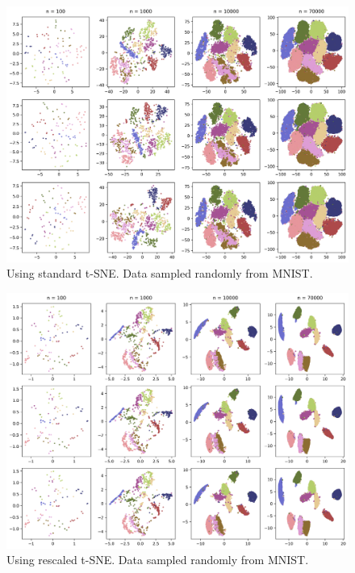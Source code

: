 \begin{figure}[h]
    \centering 
        \includegraphics[width=0.9\linewidth]{figures/rescaled/MNIST_standard_embedding_grid.png}
        \caption{Using standard t-SNE. Data sampled randomly from MNIST.}
    \label{fig:MNIST-standard}
\end{figure}

\begin{figure}[h]
    \centering 
        \includegraphics[width=0.9\linewidth]{figures/rescaled/MNIST_rescaled_embedding_grid.png}
        \caption{Using rescaled t-SNE. Data sampled randomly from MNIST.}
    \label{fig:MNIST-rescaled}
\end{figure}
\newpage 
